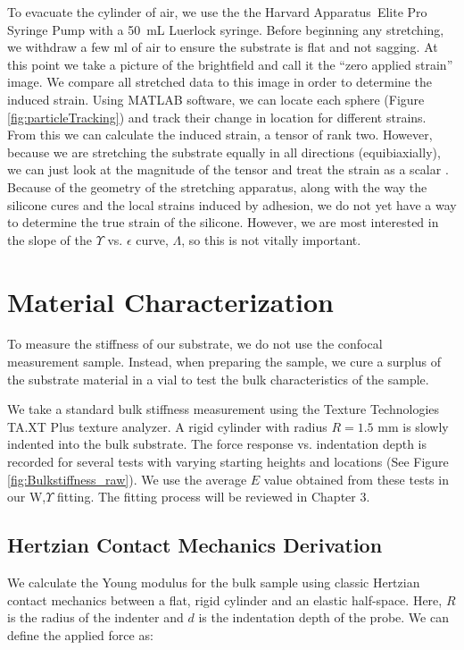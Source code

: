To evacuate the cylinder of air, we use the the Harvard Apparatus\texttrademark \ Elite Pro Syringe Pump with a 50~mL Luerlock syringe. Before beginning any stretching, we withdraw a few ml of air to ensure the substrate is flat and not sagging. At this point we take a picture of the brightfield and call it the ``zero applied strain'' image. We compare all stretched data to this image in order to determine the induced strain. Using MATLAB software, we can locate each sphere (Figure \ref{fig:particleTracking}) and track their change in location for different strains. From this we can calculate the induced strain, a tensor of rank two. However, because we are stretching the substrate equally in all directions (equibiaxially), we can just look at the magnitude of the tensor and treat the strain as a scalar \cite{xu2017direct,xu2018surface}. Because of the geometry of the stretching apparatus, along with the way the silicone cures and the local strains induced by adhesion, we do not yet have a way to determine the true strain of the silicone. However, we are most interested in the slope of the $\Upsilon$ vs. $\epsilon$ curve, $\Lambda$, so this is not vitally important.
   

\section{Material Characterization}
To measure the stiffness of our substrate, we do not use the confocal measurement sample. Instead, when preparing the sample, we cure a surplus of the substrate material in a vial to test the bulk characteristics of the sample. 

We take a standard bulk stiffness measurement using the Texture Technologies TA.XT Plus texture analyzer. A rigid cylinder with radius $R = 1.5$ mm is slowly indented into the bulk substrate. The force response vs. indentation depth is recorded for several tests with varying starting heights and locations (See Figure \ref{fig:Bulkstiffness_raw}). We use the average $ E $ value obtained from these tests in our W,$ \Upsilon $ fitting. The fitting process will be reviewed in Chapter 3. 


\subsection{Hertzian Contact Mechanics Derivation}
We calculate the Young modulus for the bulk sample using classic Hertzian contact mechanics between a flat, rigid cylinder and an elastic half-space. Here, $ R $ is the radius of the indenter and $ d $ is the indentation depth of the probe. We can define the applied force as:

